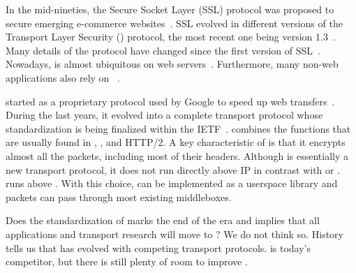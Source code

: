 In the mid-nineties, the Secure Socket Layer (SSL) protocol was proposed to secure
emerging e-commerce websites~\cite{draft-hickman-netscape-ssl}. SSL
evolved in different versions of the Transport Layer Security (\tls) protocol, the most recent one being version 1.3~\cite{rfc8446}. Many details of the \tls protocol have changed since the first version of SSL~\cite{kotzias2018coming}. Nowadays, \tls is almost ubiquitous on web servers~\cite{holz2019era}. Furthermore, many non-web applications also rely on \tls~\cite{anderson2019tls}.


\quic started as a proprietary protocol used by Google to speed up web
transfers~\cite{roskind2013quic,langley2017quic}. During the last years, it evolved into a complete transport protocol whose standardization is being finalized within the IETF~\cite{draft-ietf-quic-transport}. \quic combines the
functions that are usually found in \tcp, \tls, and HTTP/2. A key characteristic
of \quic is that it encrypts almost all the packets, including most of their headers. Although \quic is essentially a new transport protocol, it does not run
directly above IP in contrast with \sctp or \tcp. \quic runs above \udp. With this choice, \quic can be implemented as a userspace library and \quic packets can pass through most existing middleboxes. 

Does the standardization of \quic marks the end of the \tcp era and implies that all applications and transport research will move to \quic ? 
We do not think so. History tells us that \tcp has evolved with competing
transport protocols. \quic is today's competitor, but there is still plenty of
room to improve \tcp.

